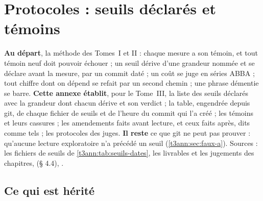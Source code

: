 
\chapter{Protocoles : seuils déclarés et témoins}\label{t3ann:protocoles}

\begin{origine}
\textbf{Au départ}, la méthode des Tomes~I et II : chaque mesure a son témoin, et tout témoin neuf doit pouvoir échouer ; un seuil dérive d'une grandeur nommée et se déclare avant la mesure, par un commit daté ; un coût se juge en séries ABBA ; tout chiffre dont on dépend se refait par un second chemin ; une phrase démentie se barre.
\textbf{Cette annexe établit}, pour le Tome~III, la liste des seuils déclarés avec la grandeur dont chacun dérive et son verdict ; la table, engendrée depuis git, de chaque fichier de seuils et de l'heure du commit qui l'a créé ; les témoins et leurs cassures ; les amendements faits avant lecture, et ceux faits après, dits comme tels ; les protocoles des juges.
\textbf{Il reste} ce que git ne peut pas prouver : qu'aucune lecture exploratoire n'a précédé un seuil (\cref{t3ann:sec:faux-a}).
Sources : les fichiers de seuils de \cref{t3ann:tab:seuils-dates}, les livrables et les jugements des chapitres,  (§ 4.4), .
\end{origine}

\section{Ce qui est hérité}\label{t3ann:sec:herite}

